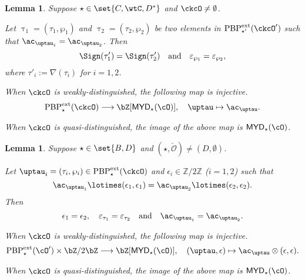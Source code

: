 \documentclass[12pt,a4paper]{amsart}
\newcommand{\AC}{\mathrm{AC}}
\def\MYD{{\mathsf{MYD}}}
\def\AND{\quad\text{and}\quad}
\def\oAC#1{\AC(#1)}
\def\AC{\mathrm{AC}}
\newcommand{\CO}{{\mathcal {O}}}
\newcommand{\Z}{\mathbb{Z}}
\def\DD{\nabla}
\numberwithin{equation}{section}
\newtheorem{lem}[thm]{Lemma}
\theoremstyle{remark}
\def\PBPe{\mathrm{PBP}^{\mathrm{ext}}}
\def\PBPes{\mathrm{PBP}^{\mathrm{ext}}_{\star}}
\def\PBPesp{\mathrm{PBP}^{\mathrm{ext}}_{\star'}}
\def\ckcOp{\ckcO^{\prime}}
\def\cOp{\cO^{\prime}}
\begin{document}
\begin{lem}\label{lem:C}
Suppose $\star \in \set{C,\wtC,D^{*}}$ and $\ckcO\neq \emptyset$.
  \begin{enuma}
    \item Let $\uptau_{1} = (\tau_{1},\wp_{1})$ and $\uptau_{2}=(\tau_{2},\wp_{2})$ be two elements in
    $\PBPesp(\ckcOp)$ such that $\ac_{\uptau_{1}} =  \ac_{\uptau_{2}}$.
    Then
    \[\Sign(\tau'_{1})=\Sign(\tau'_{2}) \quad \text{and} \quad \varepsilon_{\wp_{1}}=\varepsilon_{\wp_{2}},
    \]
    where $\tau'_{i} := \DD(\tau_{i})$ for $i=1,2$.
    \item When $\ckcO$ is weakly-distinguished, the following map is injective.
    \[
      \PBPes( \ckcO )\longrightarrow \bZ[\MYD_{\star}(\cO)],
      \quad \uptau\mapsto \ac_{\uptau}.
    \]
    \item When $\ckcO$ is quasi-distinguished, the image of the above map is $\MYD_{\star}(\cO)$.
  \end{enuma}
\end{lem}


\begin{lem}\label{lem:BD}
Suppose $\star \in \set{B,D}$ and $(\star, \check \CO)\neq (D, \emptyset)$.
  \begin{enuma}
  \item Let $\uptau_i=(\tau_i, \wp_i)\in \PBPe_\star(\ckcO)$ and
  $\epsilon_i\in \Z/2\Z$ ($i=1,2$) such that
  \[
    \ac_{\uptau_1}\lotimes (\epsilon_{1},\epsilon_{1})= \ac_{\uptau_2}\lotimes( \epsilon_{2},\epsilon_{2} ).
  \]
  Then
  \[
    \epsilon_1=\epsilon_2,\quad \varepsilon_{\tau_1}=\varepsilon_{\tau_2} \AND \ac_{\uptau_{1}}=\ac_{\uptau_{2}}.
  \]

  \item When $\ckcO$ is weakly-distinguished, the following map is injective.
  \[
    \PBPes( \cOp )\times \bZ/2\bZ \longrightarrow \bZ[\MYD_{\star}(\cO)],\quad
    (\uptau,\epsilon) \mapsto \ac_{\uptau}\otimes (\epsilon, \epsilon).
  \]
  \item When $\ckcO$ is quasi-distinguished, the image of the above map is $\MYD_{\star}(\cO)$.
\end{enuma}
\end{lem}
\end{document}
